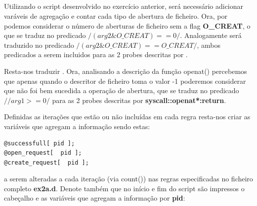 \documentclass[a4paper]{article}
\begin{document}
\subsection{}
Utilizando o script desenvolvido no exercício anterior, será necessário adicionar varáveis de agregação e contar cada tipo de abertura de ficheiro. Ora, por \textbf{} podemos considerar o número de aberturas de ficheiro sem a flag \textbf{O\_CREAT}, o que se traduz no predicado $/( arg2  \&  O\_CREAT) == 0 /$. Analogamente \textbf{} será traduzido no predicado $/ ( arg2  \&  O\_CREAT ) == O\_CREAT /$, ambos predicados a serem incluidos para as 2 probes descritas por .\par 
Resta-nos  traduzir \textbf{}. Ora, analisando a descrição da função openat() percebemos que apenas quando o descritor de ficheiro toma o valor -1 poderemos considerar que não foi bem sucedida a operação de abertura, que se traduz no predicado $//arg1 >= 0/$ para as 2 probes descritas por \textbf{syscall::openat*:return}.\par Definidas as iterações que estão ou não incluídas em cada regra resta-nos criar as variáveis que agregam a informação sendo estas:
\begin{lstlisting}
@successfull[ pid ];
@open_request[  pid ];
@create_request[  pid ];
 \end{lstlisting}
a serem alteradas a cada iteração (via count()) nas regras especificadas no ficheiro completo \textbf{ex2a.d}. Denote também que no início e fim do script são impressos o cabeçalho e as variáveis  que agregam a informação por \textbf{pid}:
\end{document}
